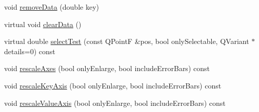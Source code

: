 \begin{DoxyCompactItemize}
\item 
void \hyperlink{classQCPGraph_a4a706020b4318f118381648ef18aca3f}{remove\+Data} (double key)
\item 
virtual void \hyperlink{classQCPGraph_ad4e94a4e44e5e76fbec81a72a977157d}{clear\+Data} ()
\item 
virtual double \hyperlink{classQCPGraph_abc9ff375aabcf2d21cca33d6baf85772}{select\+Test} (const Q\+Point\+F \&pos, bool only\+Selectable, Q\+Variant $\ast$details=0) const 
\item 
void \hyperlink{classQCPGraph_aa35b75b9032800d783df749c8a004ee9}{rescale\+Axes} (bool only\+Enlarge, bool include\+Error\+Bars) const 
\item 
void \hyperlink{classQCPGraph_a2108a729046b0ab6e0516afb249dab13}{rescale\+Key\+Axis} (bool only\+Enlarge, bool include\+Error\+Bars) const 
\item 
void \hyperlink{classQCPGraph_a2ba0e1df416486d7e74299ef8cf68bba}{rescale\+Value\+Axis} (bool only\+Enlarge, bool include\+Error\+Bars) const 
\end{DoxyCompactItemize}
